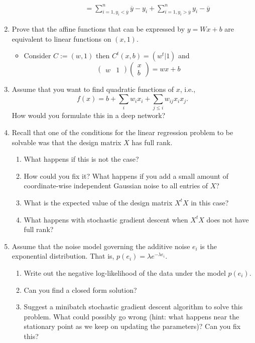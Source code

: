 \documentclass{article}
\begin{document}
\begin{enumerate}[label=\arabic*.]
\begin{enumerate}[label=\arabic*.]
\begin{itemize}
\begin{align*}
				&= \sum_{i = 1, y_i < \overline{y}}^n \overline{y} - y_i + \sum_{i = 1, y_i > \overline{y}}^n y_i - \overline{y}
				\end{align*}
			\end{itemize}
	\end{enumerate}
\item Prove that the affine functions that can be expressed by $y = Wx + b$ are equivalent to linear functions on $(x, 1)$.
	\begin{itemize}
		\item Consider $C := (w, 1)$ then $C^t(x, b) = (w^t|1)$ and
		$$
		\begin{pmatrix}
		w & 1
		\end{pmatrix}
		\begin{pmatrix}
		x \\ b
		\end{pmatrix} = 
		wx + b
		$$
	\end{itemize}
\item Assume that you want to find quadratic functions of $x$, i.e.,
	$$
	f(x) = b + \sum_i w_i x_i + \sum_{j \leq i} w_{ij} x_i x_j.
	$$
	How would you formulate this in a deep network?
\item Recall that one of the conditions for the linear regression problem to be solvable was that the design matrix $X$ has full rank.
	\begin{enumerate}[label=\arabic*.]
	\item What happens if this is not the case?
	\item How could you fix it? What happens if you add a small amount of coordinate-wise independent Gaussian noise to all entries of $X$?
	\item What is the expected value of the design matrix $X^tX$ in this case?
	\item What happens with stochastic gradient descent when $X^tX$ does not have full rank?
	\end{enumerate}
\item Assume that the noise model governing the additive noise $e_i$ is the exponential distribution. That is, $p(e_i) = \lambda e^{-\lambda e_i}$.
	\begin{enumerate}[label=\arabic*.]
	\item Write out the negative log-likelihood of the data under the model $p(e_i)$.
	\item Can you find a closed form solution?
	\item Suggest a minibatch stochastic gradient descent algorithm to solve this problem. What could possibly go wrong (hint: what happens near the stationary point as we keep on updating the parameters)? Can you fix this?

\end{enumerate}
\end{enumerate}
\end{document}
